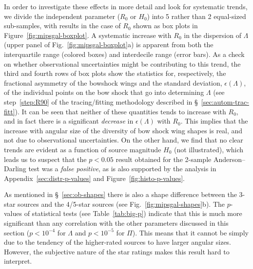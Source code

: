 In order to investigate these effects in more detail and look for
systematic trends, we divide the independent parameter (\(R_0\) or
\(H_0\)) into 5 rather than 2 equal-sized sub-samples, with results in
the case of \(R_0\) shown as box plots in
Figure~\ref{fig:mipsgal-boxplot}.  A systematic increase with \(R_0\)
in the dispersion of \(\Lambda\) (upper panel of
Fig.~\ref{fig:mipsgal-boxplot}a) is apparent from both the
interquartile range (colored boxes) and interdecile range (error
bars).  As a check on whether observational uncertainties might be
contributing to this trend, the third and fourth rows of box plots
show the statistics for, respectively, the fractional asymmetry of the
bowshock wings and the standard deviation, \(\epsilon(\Lambda)\), of the individual
points on the bow shock that go into determining \(\Lambda\) (see
step~\ref{step:R90} of the tracing/fitting methodology described in
\S~\ref{sec:autom-trac-fitt}).  It can be seen that neither of these
quantities tends to increase with \(R_0\), and in fact there is a
significant \emph{decrease} in \(\epsilon(\Lambda)\) with \(R_0\).  This implies
that the increase with angular size of the diversity of bow shock wing
shapes is real, and not due to observational uncertainties.  On the
other hand, we find that no clear trends are evident as a function of
source magnitude \(H_0\) (not illustrated), which leads us to suspect
that the \(p < 0.05\) result obtained for the 2-sample
Anderson--Darling test was a \emph{false positive}, as is also
supported by the analysis in Appendix~\ref{sec:distr-p-values} and
Figure~\ref{fig:histo-p-values}.


As mentioned in \S~\ref{sec:ob-shapes} there is also a shape
difference between the 3-star sources and the 4/5-star sources (see
Fig.~\ref{fig:mipsgal-shapes}b).  The \(p\)-values of statistical
tests (see Table~\ref{tab:big-p}) indicate that this is much more
significant than any correlation with the other parameters discussed
in this section (\(p < 10^{-4}\) for \(\Lambda\) and \(p < 10^{-5}\) for
\(\Pi\)).  This means that it cannot be simply due to the tendency of
the higher-rated sources to have larger angular sizes.  However, the
subjective nature of the star ratings makes this result hard to
interpret.

